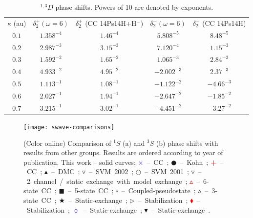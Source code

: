 \documentclass[preprint,showpacs,showkeys,preprintnumbers,amsmath,amssymb,longbibliography,pra,aps]{revtex4-1}
\begin{document}
\begin{table}
\begin{center}
\begin{ruledtabular}
\begin{tabular}{c c c c c}
$\kappa$ (au) & $\delta_2^+ (\omega = 6)$ & $\delta_2^+$ (CC 14Ps14H+H$^-$) \cite{Walters2004} & $\delta_2^- (\omega = 6)$ & $\delta_2^-$ (CC 14Ps14H) \cite{Blackwood2002} \\
\colrule
$0.1$ & $1.358^{-4}$ & $1.46^{-4}$ & $5.808^{-5}$ & $8.48^{-5}$ \\
$0.2$ & $2.987^{-3}$ & $3.15^{-3}$ & $7.120^{-4}$ & $1.15^{-3}$ \\
$0.3$ & $1.592^{-2}$ & $1.65^{-2}$ & $1.065^{-3}$ & $2.84^{-3}$ \\
$0.4$ & $4.933^{-2}$ & $4.95^{-2}$ & $-2.002^{-3}$ & $2.37^{-3}$ \\
$0.5$ & $1.113^{-1}$ & $1.08^{-1}$ & $-1.122^{-2}$ & $-4.66^{-3}$ \\
$0.6$ & $2.027^{-1}$ & $1.94^{-1}$ & $-2.647^{-2}$ & $-1.85^{-2}$ \\
$0.7$ & $3.215^{-1}$ & $3.02^{-1}$ & $-4.451^{-2}$ & $-3.27^{-2}$ \\
\end{tabular}
\end{ruledtabular}
\caption{$^{1,3}D$ phase shifts. Powers of 10 are denoted by exponents.}
\label{tab:DWavePhase}
\end{center}
\end{table}



\begin{figure}[H]
	\centering
	\texttt{[image: swave-comparisons]}
	\caption{(Color online) Comparison of $^1S$ (a) and $^3S$ (b) phase shifts
with results from other groups. Results are ordered according to year of
publication. This work -- solid curves;
\mbox{\textcolor{blue}{$\times$} -- CC \cite{Walters2004};}
\mbox{$\CIRCLE$ -- Kohn \cite{VanReeth2003};}
\mbox{\textcolor{red}{\textbf{+}} -- CC \cite{Blackwood2002};}
\mbox{$\blacktriangle$ -- DMC \cite{Chiesa2002};} 
\mbox{$\triangledown$ -- SVM 2002 \cite{Ivanov2002};} 
\mbox{$\Circle$ -- SVM 2001 \cite{Ivanov2001};} 
\mbox{\textcolor[RGB]{0,127,0}{$\triangledown$} -- 2 channel / static exchange with model exchange \cite{Biswas2001};} 
\mbox{\textcolor{red}{$\vartriangle$} -- 6-state CC \cite{Sinha2000};} 
\mbox{$\blacksquare$ -- 5-state CC \cite{Adhikari1999};} 
\mbox{$\square$ -- Coupled-pseudostate \cite{Campbell1998};} 
\mbox{$\vartriangle$ -- 3-state CC \cite{Sinha1997};} 
\mbox{\textcolor[RGB]{0,127,0}{$\bigstar$} -- Static-exchange \cite{Ray1997};} 
\mbox{$\triangleright$ -- Stabilization \cite{Drachman1976};} 
\mbox{\textcolor{red}{$\blacklozenge$} -- Stabilization \cite{Drachman1975};}
\mbox{\textcolor{blue}{$\lozenge$} -- Static-exchange \cite{Hara1975};}
\mbox{$\blacktriangledown$ -- Static-exchange \cite{Fraser1961}.}}
	\label{fig:swave-comparisons}
\end{figure}
\end{document}

